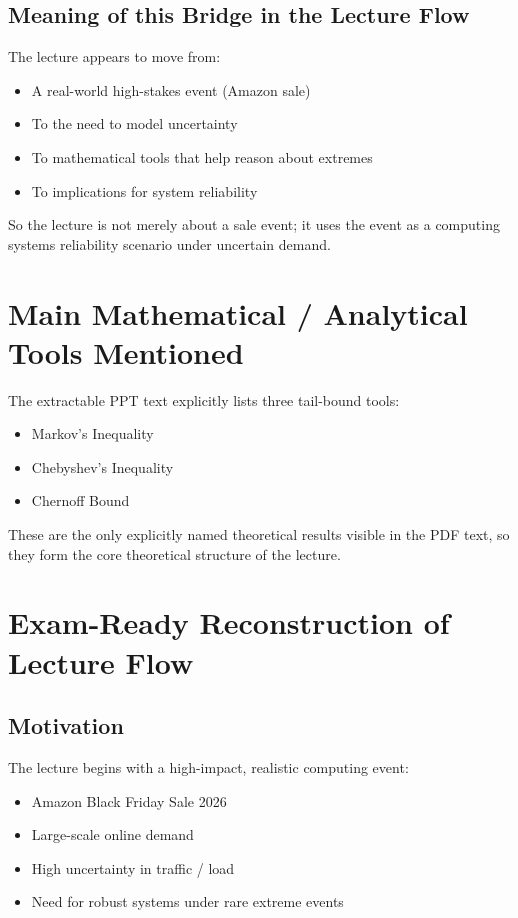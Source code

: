 \documentclass[11pt]{article}
\begin{document}
\subsection*{Meaning of this Bridge in the Lecture Flow}

The lecture appears to move from:

\begin{itemize}
    \item A real-world high-stakes event (Amazon sale)
    \item To the need to model uncertainty
    \item To mathematical tools that help reason about extremes
    \item To implications for system reliability
\end{itemize}

So the lecture is not merely about a sale event; it uses the event as a computing systems reliability scenario under uncertain demand.

\section{Main Mathematical / Analytical Tools Mentioned}

The extractable PPT text explicitly lists three tail-bound tools:

\begin{itemize}
    \item Markov's Inequality
    \item Chebyshev's Inequality
    \item Chernoff Bound
\end{itemize}

These are the only explicitly named theoretical results visible in the PDF text, so they form the core theoretical structure of the lecture.

\section{Exam-Ready Reconstruction of Lecture Flow}

\subsection{Motivation}

The lecture begins with a high-impact, realistic computing event:

\begin{itemize}
    \item Amazon Black Friday Sale 2026
    \item Large-scale online demand
    \item High uncertainty in traffic / load
    \item Need for robust systems under rare extreme events
\end{itemize}
\end{document}
